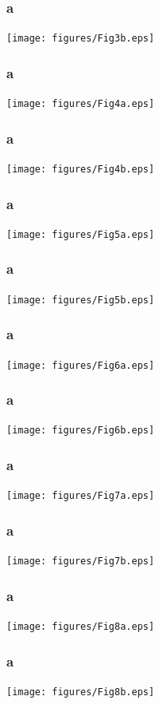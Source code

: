 \documentclass{beamer}
\begin{document}
							 \begin{frame}
							 	\frametitle{a}
							 				\texttt{[image: figures/Fig3b.eps]}
							 \end{frame}
							 \begin{frame}
							 	\frametitle{a}
							 				\texttt{[image: figures/Fig4a.eps]}
							 \end{frame}
							 \begin{frame}
							 	\frametitle{a}
							 				\texttt{[image: figures/Fig4b.eps]}
							 \end{frame}
							 \begin{frame}
							 	\frametitle{a}
							 				\texttt{[image: figures/Fig5a.eps]}
							 \end{frame}
							 \begin{frame}
							 	\frametitle{a}
							 				\texttt{[image: figures/Fig5b.eps]}
							 \end{frame}
							 \begin{frame}
							 	\frametitle{a}
							 				\texttt{[image: figures/Fig6a.eps]}
							 \end{frame}
							 \begin{frame}
							 	\frametitle{a}
							 				\texttt{[image: figures/Fig6b.eps]}
							 \end{frame}
							 \begin{frame}
							 	\frametitle{a}
							 				\texttt{[image: figures/Fig7a.eps]}
							 \end{frame}
							 \begin{frame}
							 	\frametitle{a}
							 				\texttt{[image: figures/Fig7b.eps]}
							 \end{frame}
							 \begin{frame}
							 	\frametitle{a}
							 				\texttt{[image: figures/Fig8a.eps]}
							 \end{frame}
							 \begin{frame}
							 	\frametitle{a}
							 				\texttt{[image: figures/Fig8b.eps]}
							 \end{frame}
\end{document}
